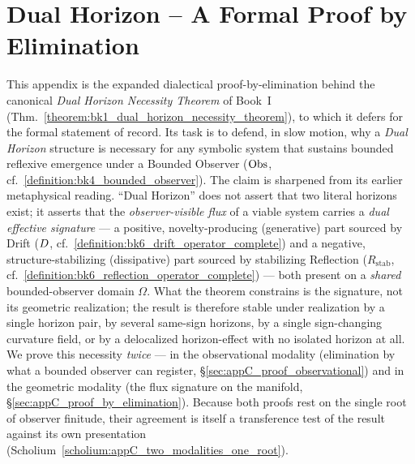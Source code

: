 \clearpage
{}
\chapter{Dual Horizon – A Formal Proof by Elimination}
\label{sec:appC_dual_horizon}
This appendix is the expanded dialectical proof-by-elimination behind the canonical \emph{Dual Horizon Necessity Theorem} of Book~I (Thm.~\ref{theorem:bk1_dual_horizon_necessity_theorem}), to which it defers for the formal statement of record. Its task is to defend, in slow motion, why a \emph{Dual Horizon} structure is necessary for any symbolic system that sustains bounded reflexive emergence under a Bounded Observer (\(\mathrm{Obs}\), cf.~\ref{definition:bk4_bounded_observer}). The claim is sharpened from its earlier metaphysical reading. ``Dual Horizon'' does not assert that two literal horizons exist; it asserts that the \emph{observer-visible flux} of a viable system carries a \emph{dual effective signature} --- a positive, novelty-producing (generative) part sourced by Drift (\(D\), cf.~\ref{definition:bk6_drift_operator_complete}) and a negative, structure-stabilizing (dissipative) part sourced by stabilizing Reflection (\(R_{\mathrm{stab}}\), cf.~\ref{definition:bk6_reflection_operator_complete}) --- both present on a \emph{shared} bounded-observer domain \(\Omega\). What the theorem constrains is the signature, not its geometric realization; the result is therefore stable under realization by a single horizon pair, by several same-sign horizons, by a single sign-changing curvature field, or by a delocalized horizon-effect with no isolated horizon at all. We prove this necessity \emph{twice} --- in the observational modality (elimination by what a bounded observer can register, \S\ref{sec:appC_proof_observational}) and in the geometric modality (the flux signature on the manifold, \S\ref{sec:appC_proof_by_elimination}). Because both proofs rest on the single root of observer finitude, their agreement is itself a transference test of the result against its own presentation (Scholium~\ref{scholium:appC_two_modalities_one_root}).

